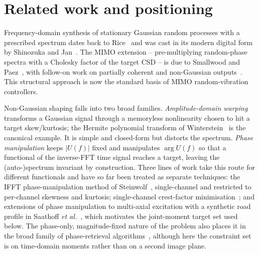 \documentclass[10pt,a4paper]{article}
\numberwithin{equation}{section}
\begin{document}
\section*{Related work and positioning}

Frequency-domain synthesis of stationary Gaussian random processes with a prescribed spectrum dates back to Rice~\cite{rice1944mathematical} and was cast in its modern digital form by Shinozuka and Jan~\cite{shinozuka1972digital}. The MIMO extension -- pre-multiplying random-phase spectra with a Cholesky factor of the target CSD -- is due to Smallwood and Paez~\cite{smallwood1993coherent}, with follow-on work on partially coherent and non-Gaussian outputs~\cite{smallwood_nongaussian,cui2011matrix,hsueh1990generalized}. This structural approach is now the standard basis of MIMO random-vibration controllers.

Non-Gaussian shaping falls into two broad families. \emph{Amplitude-domain warping} transforms a Gaussian signal through a memoryless nonlinearity chosen to hit a target skew/kurtosis; the Hermite polynomial transform of Winterstein~\cite{winterstein1988nonlinear} is the canonical example. It is simple and closed-form but distorts the spectrum. \emph{Phase manipulation} keeps $|U(f)|$ fixed and manipulates $\arg U(f)$ so that a functional of the inverse-FFT time signal reaches a target, leaving the (auto-)spectrum invariant by construction. Three lines of work take this route for different functionals and have so far been treated as separate techniques: the IFFT phase-manipulation method of Steinwolf~\cite{steinwolf2011ifft,steinwolf2011twr,steinwolf_book_ngaussian}, single-channel and restricted to per-channel skewness and kurtosis; single-channel crest-factor minimisation~\cite{schroeder1970lowpeak,vanderouderaa1988peak,guillaume1991crest,retzler2022crest}; and extensions of phase manipulation to multi-axial excitation with a synthetic road profile in Saathoff \emph{et al.}~\cite{saathoff2006synthetic}, which motivates the joint-moment target set used below. The phase-only, magnitude-fixed nature of the problem also places it in the broad family of phase-retrieval algorithms~\cite{gerchberg1972practical,fienup1982phase}, although here the constraint set is on time-domain moments rather than on a second image plane.
\end{document}
